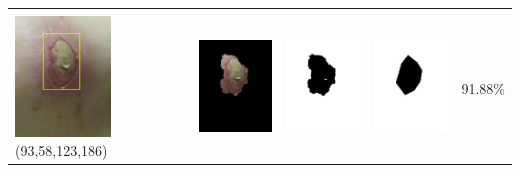 \begin{table}[H]
\begin{tabular}{|m{1.0in}|m{1.0in}|m{1.0in}|m{1.0in}|m{0.6in}|}
		&  &  & \\
		\includegraphics[width=1.0in]{gambar/hasil_segmentasi/luka_kuning/image_19_rect.jpg} {\centering\fontsize{10}{10}\selectfont(93,58,123,186)}&
		\includegraphics[width=1.0in]{gambar/hasil_segmentasi/luka_kuning/result_19.jpg}&
		\includegraphics[width=1.0in]{gambar/hasil_segmentasi/luka_kuning/mask_r_19.jpg}&
		\includegraphics[width=1.0in]{gambar/hasil_segmentasi/luka_kuning/19_r.jpg}&
		91.88\% \\
		\hline


\end{tabular}
\end{table}
